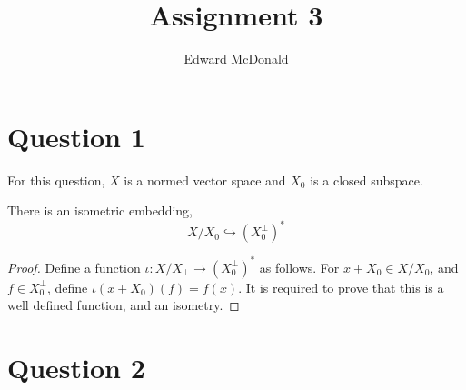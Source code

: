 \documentclass{unswmaths}
\begin{document}
\subject{Functional Analysis}
\author{Edward McDonald}
\title{Assignment 3}


\newcommand{\Real}{\operatorname{Re}}
\newcommand{\Img}{\operatorname{Im}}
\newcommand{\lan}{\langle}
\newcommand{\ran}{\rangle}
\newcommand{\Proj}{\mathbb{P}_+}
\newcommand{\isom}{\cong}


\unswtitle{}
\section*{Question 1}
For this question, $X$ is a normed vector space and $X_0$ is a closed subspace.
\begin{theorem}
    There is an isometric embedding,
    \begin{equation*}
        X/X_0 \hookrightarrow (X_0^\perp)^*
    \end{equation*}
\end{theorem}
\begin{proof}
    Define a function $\iota:X/X_\perp \rightarrow (X_0^\perp)^*$ as follows. For $x+X_0 \in X/X_0$, 
    and $f \in X_0^\perp$, define $\iota(x+X_0)(f) = f(x)$. It is required to prove that this is a well
    defined function, and an isometry.
\end{proof}
\section*{Question 2}
\end{document}
